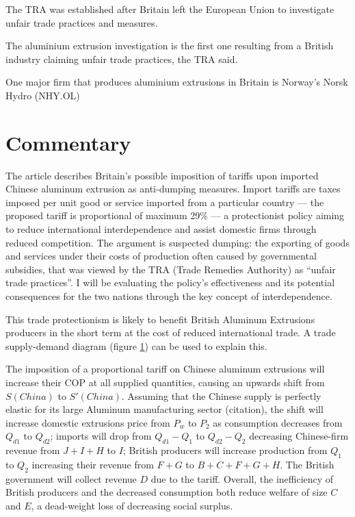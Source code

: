 \documentclass[a4paper,12pt]{article}
\newcommand{\tikzfig}[1]{}
\begin{document}
The TRA was established after Britain left the European Union to investigate unfair trade practices and measures.

The aluminium extrusion investigation is the first one resulting from a British industry claiming unfair trade practices, the TRA said.

One major firm that produces aluminium extrusions in Britain is Norway's Norsk Hydro (NHY.OL)

\newpage
\section*{Commentary}


The article describes Britain's possible imposition of tariffs upon imported Chinese aluminum extrusion as anti-dumping measures. Import tariffs are taxes imposed per unit good or service imported from a particular country --- the proposed tariff is proportional of maximum 29\% --- a protectionist policy aiming to reduce international interdependence and assist domestic firms through reduced competition. The argument is suspected dumping: the exporting of goods and services under their costs of production often caused by governmental subsidies, that was viewed by the TRA (Trade Remedies Authority) as ``unfair trade practices''. I will be evaluating the policy's effectiveness and its potential consequences for the two nations through the key concept of interdependence.

This trade protectionism is likely to benefit British Aluminum Extrusions producers in the short term at the cost of reduced international trade. A trade supply-demand diagram (figure \ref{fig:tariff}) can be used to explain this.

\begin{figure}[H]
	\centering
	 \tikzfig{assets/tariffs.txt}
	\caption{}
	\label{fig:tariff}
\end{figure}

The imposition of a proportional tariff on Chinese aluminum extrusions will increase their COP at all supplied quantities, causing an upwards shift from $S(China)$ to $S'(China)$. Assuming that the Chinese supply is perfectly elastic for its large Aluminum manufacturing sector (citation), the shift will increase domestic extrusions price from $P_w$ to $P_2$ as consumption decreases from $Q_{d1}$ to $Q_{d2}$;
imports will drop from $Q_{d1}-Q_{1}$ to $Q_{d2}-Q_{2}$ decreasing Chinese-firm revenue from $J+I+H$ to $I$; British producers will increase production from $Q_1$ to $Q_2$ increasing their revenue from $F+G$ to $B+C+F+G+H$. The British government will collect revenue $D$ due to the tariff. Overall, the inefficiency of British producers and the decreased consumption both reduce welfare of size $C$ and $E$, a dead-weight loss of decreasing social surplus.
\end{document}
